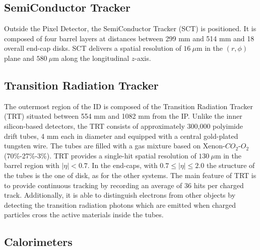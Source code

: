 \subsection*{SemiConductor Tracker}\label{sec:sec:LHCAtlas/ATLAS/innerDetector/SCT}

Outside the Pixel Detector, the SemiConductor Tracker (SCT) is positioned.
It is composed of four barrel layers at distances between 299 mm and 514 mm and 18 overall end-cap disks. 
SCT delivers a spatial resolution of $16\ \mu\text{m}$ in the $(r,\phi)$ plane and $580\ \mu\text{m}$ along the longitudinal $z$-axis.\\

\subsection*{Transition Radiation Tracker}\label{sec:sec:LHCAtlas/ATLAS/innerDetector/TCT}
The outermost region of the ID is composed of the Transition Radiation Tracker (TRT) situated between 554 mm  and 1082 mm from the IP. 
Unlike the inner silicon-based detectors, the TRT consists of approximately 300,000 polyimide drift tubes, 4 mm each in diameter and equipped with a central gold-plated tungsten wire. 
The tubes are filled with a gas mixture based on Xenon-$CO_2$-$O_2$ (70\%-27\%-3\%).
TRT provides a single-hit spatial resolution of $130\ \mu\text{m}$ in the barrel region with $|\eta| < 0.7$. In the end-caps, with $0.7\leq |\eta| \leq 2.0$ the structure of the tubes is the one of disk, as for the other systems. 
The main feature of TRT is to provide continuous tracking by recording an average of 36 hits per charged track.
Additionally, it is able to distinguish electrons from other objects by detecting the transition radiation photons which are emitted when charged particles cross the active materials inside the tubes. 

\subsection{Calorimeters}\label{sec:LHCAtlas/ATLAS/Calo}

